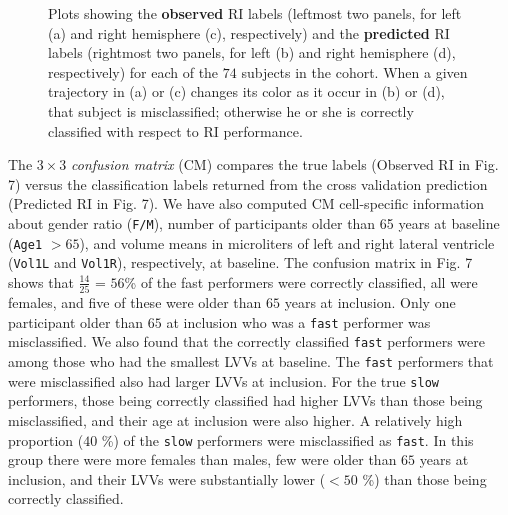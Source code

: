 \documentclass[10pt,letterpaper]{article}
\begin{document}
\vspace{3mm}
\begin{figure}[H]
\caption{
Plots showing the {\bf observed} RI labels (leftmost two panels, for left (a) and right hemisphere (c), respectively) and the {\bf predicted} RI labels (rightmost two panels, for left (b) 
and right hemisphere (d), respectively) for each of the $74$ subjects in the cohort. When a given trajectory in (a) or (c) changes its color as it occur in (b) or (d), that subject is misclassified; otherwise he or she is correctly classified with respect to RI performance. \\}
\label{fig 6}
\end{figure}
\vspace{3mm}



The $3 \times 3$ {\it confusion matrix} (CM) compares the true labels (Observed RI in Fig. 7) versus the classification labels returned from the cross validation prediction (Predicted RI in Fig. 7). We have also computed CM cell-specific information about gender ratio ({\tt F/M}), number of participants older than 65 years at baseline ({\tt Age1} $> 65$), and volume means in microliters of left and right lateral ventricle ({\tt Vol1L} and {\tt Vol1R}), respectively, at baseline. The confusion matrix in Fig. 7 shows that $\frac{14}{25}$ = $56$\% of the fast performers were correctly classified, all were females, and five of these were older than $65$ years at inclusion. Only one participant older than $65$ at inclusion who was a {\tt fast} performer was misclassified. We also found that the correctly classified {\tt fast} performers were among those who had the smallest LVVs at baseline. The {\tt fast} performers that were misclassified also had larger LVVs at inclusion. For the true {\tt slow} performers, those being correctly classified had higher LVVs than those being misclassified, and their age at inclusion were also higher. A relatively high proportion ($40$ \%) of the {\tt slow} performers were misclassified as {\tt fast}. In this group there were more females than males, few were older than $65$ years at inclusion, and their LVVs were substantially lower ($<50$ \%) than those being correctly classified.
\end{document}
